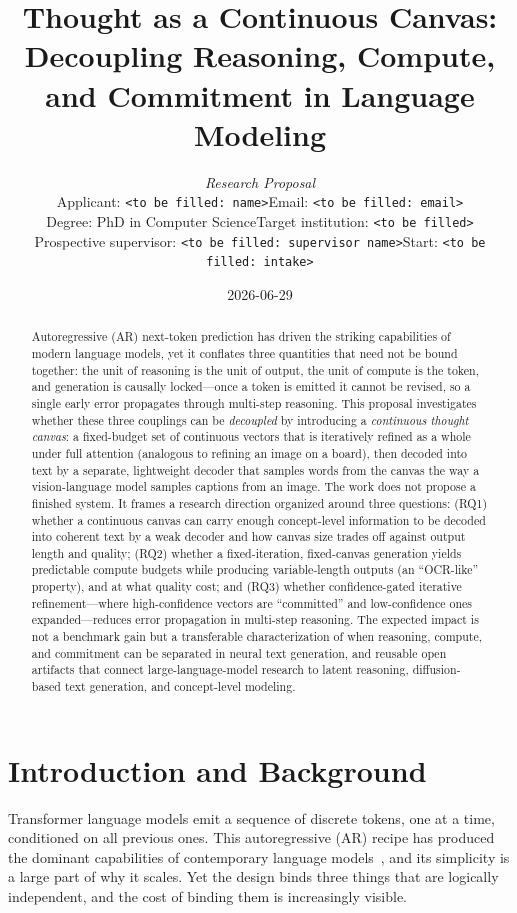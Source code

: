 \documentclass[11pt,a4paper]{article}
\title{\vspace{-2em}\textbf{Thought as a Continuous Canvas:\\
Decoupling Reasoning, Compute, and Commitment in Language Modeling}}
\author{\textit{Research Proposal}\\
Applicant: \texttt{<to be filled: name>}\quad Email: \texttt{<to be filled: email>}\\
Degree: PhD in Computer Science\quad Target institution: \texttt{<to be filled>}\\
Prospective supervisor: \texttt{<to be filled: supervisor name>}\quad Start: \texttt{<to be filled: intake>}}
\date{2026-06-29}
\begin{document}
\maketitle

\begin{abstract}
\noindent
Autoregressive (AR) next-token prediction has driven the striking capabilities of modern language models, yet it conflates three quantities that need not be bound together: the unit of reasoning is the unit of output, the unit of compute is the token, and generation is causally locked---once a token is emitted it cannot be revised, so a single early error propagates through multi-step reasoning. This proposal investigates whether these three couplings can be \emph{decoupled} by introducing a \emph{continuous thought canvas}: a fixed-budget set of continuous vectors that is iteratively refined as a whole under full attention (analogous to refining an image on a board), then decoded into text by a separate, lightweight decoder that samples words from the canvas the way a vision-language model samples captions from an image. The work does not propose a finished system. It frames a research direction organized around three questions: (RQ1) whether a continuous canvas can carry enough concept-level information to be decoded into coherent text by a weak decoder and how canvas size trades off against output length and quality; (RQ2) whether a fixed-iteration, fixed-canvas generation yields predictable compute budgets while producing variable-length outputs (an ``OCR-like'' property), and at what quality cost; and (RQ3) whether confidence-gated iterative refinement---where high-confidence vectors are ``committed'' and low-confidence ones expanded---reduces error propagation in multi-step reasoning. The expected impact is not a benchmark gain but a transferable characterization of when reasoning, compute, and commitment can be separated in neural text generation, and reusable open artifacts that connect large-language-model research to latent reasoning, diffusion-based text generation, and concept-level modeling.
\end{abstract}

\section{Introduction and Background}

Transformer language models emit a sequence of discrete tokens, one at a time, conditioned on all previous ones. This autoregressive (AR) recipe has produced the dominant capabilities of contemporary language models~\cite{gpt3,chain_of_thought}, and its simplicity is a large part of why it scales. Yet the design binds three things that are logically independent, and the cost of binding them is increasingly visible.
\end{document}

